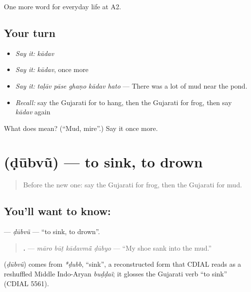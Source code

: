 \begin{grammarlens}[title={What you've built}]
One more word for everyday life at A2.
\end{grammarlens}

\subsection*{Your turn}
\begin{itemize}
\raggedright
  \item \emph{Say it:} \emph{kādav}
  \item \emph{Say it:} \emph{kādav}, once more
  \item \emph{Say it:} \emph{taḷāv pāse ghaṇo kādav hato} — There was a lot of mud near the pond.
  \item \emph{Recall:} say the Gujarati for to hang, then the Gujarati for frog, then say \emph{kādav} again
\end{itemize}

\begin{tcolorbox}[breakable,colback=teal!4,colframe=teal!35!black,title={Before you move on}]
What does  mean? (\textquotedblleft{}Mud, mire\textquotedblright{}.) Say it once more.
\end{tcolorbox}
\section[\texorpdfstring{\gu{ડૂબવું} (ḍūbvũ)}{ડૂબવું (ḍūbvũ)}]{ (ḍūbvũ) — to sink, to drown}

\label{lesson:GU-C239-dubvu}



\begin{quote}
Before the new one: say the Gujarati for frog, then the Gujarati for mud.
\end{quote}

\subsection*{You'll want to know: }
\textbf{} — \emph{ḍūbvũ} — \textquotedblleft{}to sink, to drown\textquotedblright{}.

\begin{quote}
\textbf{   .} — \emph{māro būṭ kādavmā̃ ḍūbyo} — \textquotedblleft{}My shoe sank into the mud.\textquotedblright{}
\end{quote}

\begin{cousinweb}
\textbf{} (\emph{ḍūbvũ}) comes from \emph{*ḍubb}, \textquotedblleft{}sink\textquotedblright{}, a reconstructed form that CDIAL reads as a reshuffled Middle Indo-Aryan \emph{buḍḍaï}; it glosses the Gujarati verb \textquotedblleft{}to sink\textquotedblright{} (CDIAL 5561).
\end{cousinweb}

